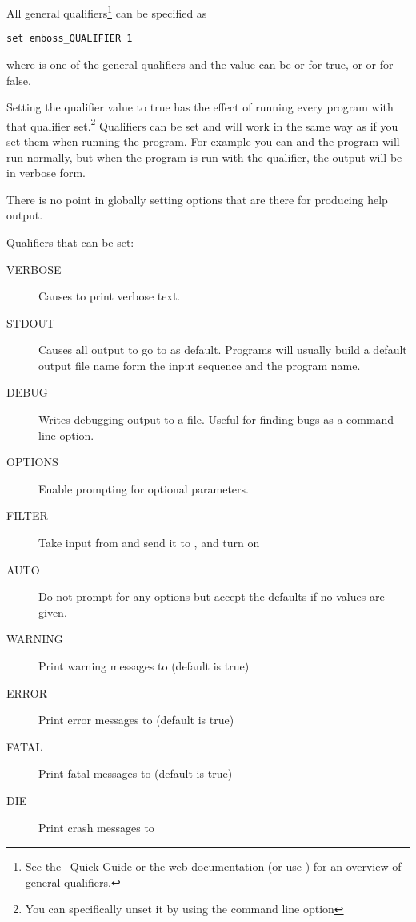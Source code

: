 \documentclass{report}
\begin{document}
All general qualifiers\footnote{See the \EMBOSS\ Quick Guide or the
web documentation (or use ) for an
overview of general qualifiers.} can be specified as

\begin{verbatim}
set emboss_QUALIFIER 1
\end{verbatim}

where  is one of the general qualifiers and the
value can be  or  for true, or  or
 for false.

Setting the qualifier value to true has the effect of running every
program with that qualifier set.\footnote{You can specifically unset
it by using the  command line option} Qualifiers
can be set and will work in the same way as if you set them when
running the program. For example you can  and the program will run normally, but when the program is run with
the  qualifier, the output will be in verbose form.

There is no point in globally setting options that are there for
producing help output.

Qualifiers that can be set:

\begin{description}

\item[VERBOSE] Causes  to print verbose text.

\item[STDOUT] Causes all output to go to  as
default. Programs will usually build a default output file name form
the input sequence and the program name.

\item[DEBUG] Writes debugging output to a file. Useful for finding
bugs as a command line option.

\item[OPTIONS] Enable prompting for optional parameters.

\item[FILTER] Take input from  and send it to
, and turn on 

\item[AUTO] Do not prompt for any options but accept the defaults if
no values are given.

\item[WARNING] Print warning messages to  (default is true)

\item[ERROR] Print error messages to  (default is true)

\item[FATAL] Print fatal messages to  (default is true)

\item[DIE] Print crash messages to 

\end{description}
\end{document}
